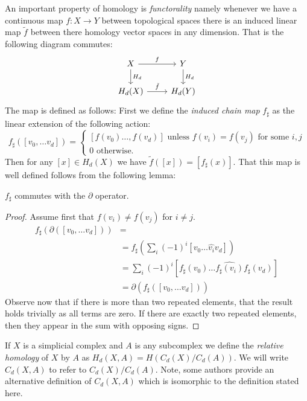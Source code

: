 An important property of homology is \emph{functorality} namely whenever we have a continuous map $f: X \rightarrow Y$ between topological spaces there is an induced linear map $\tilde{f}$ between there homology vector spaces in any dimension. That is the following diagram commutes:
\[ \begin{tikzcd}
X \arrow{r}{f}\arrow{d}{H_d} & Y \arrow{d}{H_d} \\
H_d(X) \arrow{r}{\tilde{f}} & H_d(Y)
\end{tikzcd} \]
The map is defined as follows: First we define the \emph{induced chain map} $f_\sharp$ as the linear extension of the following action: 
\[ f_\sharp([v_0, \ldots v_d]) = 
\begin{cases} 
    [f(v_0) \ldots, f(v_d)] \textrm{ unless } f(v_i) = f(v_j) \textrm{ for some } i,j \\
    0 \textrm{ otherwise. }
   \end{cases}
\]
Then for any $[x] \in H_d(X)$ we have $\tilde{f}([x]) = [f_{\sharp}(x)]$.  That this map is well defined follows from 
the following lemma:
\begin{lemma}
$f_\sharp$ commutes with the $\partial$ operator. 
\end{lemma}
\begin{proof}
Assume first that $f(v_i) \neq f(v_j)$ for $i \neq j$.
\begin{align*}
f_\sharp(\partial([v_0, \ldots v_d])) &= \\
&= f_{\sharp}(\sum_i (-1)^i[v_0 \ldots \hat{v_i} v_d])  \\
&=  \sum_i(-1)^i [f_{\sharp}(v_0) \ldots \hat{f_{\sharp}(v_i)} f_{\sharp}(v_d)] \\
&=  \partial(f_\sharp([v_0, \ldots v_d]))
\end{align*}
Observe now that if there is more than two repeated elements, that the result holds trivially as all terms are zero. If there are exactly two repeated elements, then they appear
in the sum with opposing signs.
\end{proof}

If $X$ is a simplicial complex and $A$ is any subcomplex we define the \emph{relative homology} of $X$ by $A$ as $H_d(X,A) = H(C_d(X)/C_d(A))$. We will write $C_d(X,A)$ to refer to $C_d(X)/C_d(A)$. Note, some authors provide an alternative definition of $C_d(X,A)$ which is isomorphic to the definition stated here.

